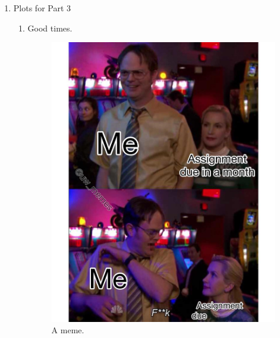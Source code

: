 \documentclass[12pt,letterpaper]{article}
\begin{document}
\begin{enumerate}[leftmargin=!,labelindent=5pt]
    \item Plots for Part 3
        \begin{enumerate}
            \item Good times.
                \begin{figure}[H]
                    \centering
                    \includegraphics[width=15cm]{images/figure3.jpg}
                    \caption{A meme.}
                    \label{fig:3}
                \end{figure}
        \end{enumerate}
\end{enumerate}
\end{document}

